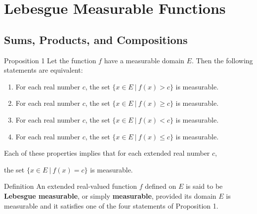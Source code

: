 \chapter{Lebesgue Measurable Functions}

\section{Sums, Products, and Compositions}
\begin{flushleft}
    \begin{namedthm*}{Proposition 1}
        Let the function $f$ have a measurable domain $E$. Then the following statements are equivalent:
        \begin{enumerate}[label=(\roman*),align=left]
            \item For each real number $c$, the set $\{x\in E\ |\ f(x)>c\}$ is measurable.
            \item For each real number $c$, the set $\{x\in E\ |\ f(x)\ge c\}$ is measurable.
            \item For each real number $c$, the set $\{x\in E\ |\ f(x)<c\}$ is measurable.
            \item For each real number $c$, the set $\{x\in E\ |\ f(x)\le c\}$ is measurable.
        \end{enumerate}
        Each of these properties implies that for each extended real number $c$,
        \begin{center}
            the set $\{x\in E\ |\ f(x)= c\}$ is measurable.
        \end{center}
    \end{namedthm*}

    \begin{namedthm*}{Definition}
        An extended real-valued function $f$ defined on $E$ is said to be \textbf{Lebesgue measurable}, or simply \textbf{measurable}, provided its domain $E$ is measurable and it satisfies one of the four statements of Proposition 1.        
    \end{namedthm*}


\end{flushleft}
